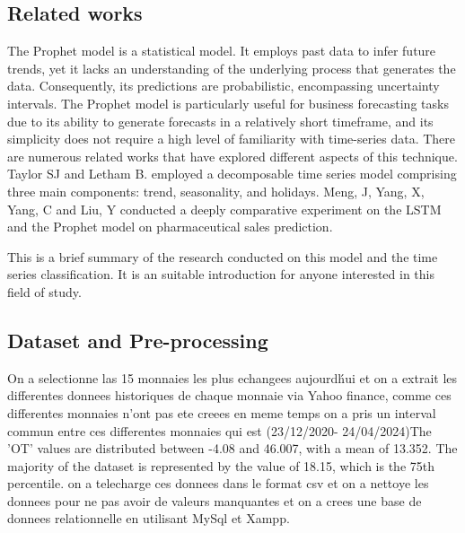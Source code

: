 \documentclass[10pt]{article}
\begin{document}
\begin{multicols}{2}

\subsection{Related works}
The Prophet model is a statistical model. It employs past data to infer future trends, yet it lacks an understanding of the underlying process that generates the data. Consequently, its predictions are probabilistic, encompassing uncertainty intervals.
\newline The Prophet model is particularly useful for business forecasting tasks due to its ability to generate forecasts in a relatively short timeframe, and its simplicity does not require a high level of familiarity with time-series data.
\newline There are numerous related works that have explored different aspects of this technique. Taylor SJ and Letham B. \cite{c3} employed a decomposable time series model comprising three main components: trend, seasonality, and holidays. \newline
Meng, J, Yang, X, Yang, C and Liu, Y \cite{c7} conducted a deeply comparative experiment on the LSTM and the Prophet model on pharmaceutical sales prediction.

\vspace{3pt}
This is a brief summary of the research conducted on this model and the time series classification. It is an suitable introduction for anyone interested in this field of study.



\subsection{Dataset and Pre-processing}
On a selectionne las 15 monnaies les plus echangees aujourd\'hui et on a extrait les differentes donnees historiques de chaque monnaie via Yahoo finance, comme ces differentes monnaies n'ont pas ete creees en meme temps on a pris un interval commun entre ces differentes monnaies qui est (23/12/2020- 24/04/2024)\newline The 'OT' values are distributed between -4.08 and 46.007, with a mean of 13.352. The majority of the dataset is represented by the value of 18.15, which is the 75th percentile.
on a telecharge ces donnees dans le format csv et on a nettoye les donnees pour ne pas avoir de valeurs manquantes et on a crees une base de donnees relationnelle en utilisant MySql et Xampp.


\end{multicols}
\end{document}
